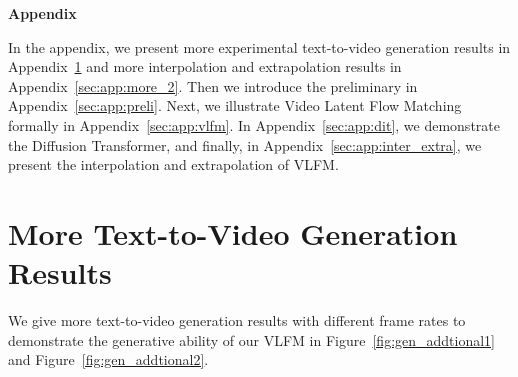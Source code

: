 \begin{center}
	\textbf{\LARGE Appendix }
\end{center}


In the appendix, we present more experimental text-to-video generation results in Appendix~\ref{sec:app:more_1} and more interpolation and extrapolation results in Appendix~\ref{sec:app:more_2}. Then we introduce the preliminary in Appendix~\ref{sec:app:preli}. Next, we illustrate Video Latent Flow Matching formally in Appendix~\ref{sec:app:vlfm}. In Appendix~\ref{sec:app:dit}, we demonstrate the Diffusion Transformer, and finally, in Appendix~\ref{sec:app:inter_extra}, we present the interpolation and extrapolation of VLFM.

\section{More Text-to-Video Generation Results} \label{sec:app:more_1}

We give more text-to-video generation results with different frame rates to demonstrate the generative ability of our VLFM in Figure~\ref{fig:gen_addtional1} and Figure~\ref{fig:gen_addtional2}.

\begin{figure*}[!ht]
\begin{center}
\centering
     \\
\end{center}
\caption{Generated videos with different frame rates $\{8, 12, 16\}$. }
\label{fig:gen_addtional1}
\end{figure*}

\begin{figure*}[!ht]
\begin{center}
\centering
     \\
\end{center}
\caption{Generated videos with different frame rates $\{8, 12, 16\}$. }
\label{fig:gen_addtional2}
\end{figure*}

